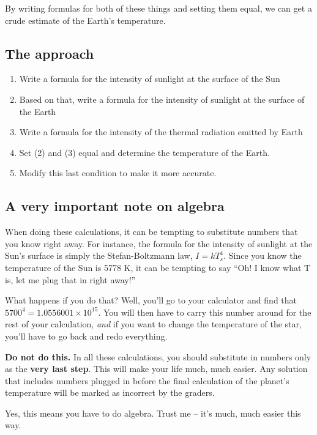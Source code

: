 \documentclass[11pt]{article}
\begin{document}
By writing formulas for both of these things and setting them equal, we can get a crude estimate of the Earth's temperature.

\subsection*{The approach}

\begin{enumerate}
\item{Write a formula for the intensity of sunlight at the surface of the Sun}
\item{Based on that, write a formula for the intensity of sunlight at the surface of the Earth}
\item{Write a formula for the intensity of the thermal radiation emitted by Earth}
\item{Set (2) and (3) equal and determine the temperature of the Earth.}
\item{Modify this last condition to make it more accurate.}
\end{enumerate}

\subsection*{A very important note on algebra}

When doing these calculations, it can be tempting to substitute numbers that you know right away. For instance, the formula for the intensity of sunlight at the Sun's surface is 
simply the Stefan-Boltzmann law, $I=kT_s^4$. Since you know the temperature of the Sun is 5778 K, it can be tempting to say ``Oh! I know what T is, let me plug that in right away!''

What happens if you do that? Well, you'll go to your calculator and find that $5700^4 = 1.0556001 \times 10^{15}$. You will then have to carry this number around for the rest of your 
calculation, {\it and} if you want to change the temperature of the star, you'll have to go back and redo everything. 

{\bf Do not do this.} In all these calculations, you should substitute in numbers only as the {\bf very last step}. This will make your life much, much easier. Any solution that includes
numbers plugged in before the final calculation of the planet's temperature will be marked as incorrect by the graders. 

Yes, this means you have to do algebra. Trust me -- it's much, much easier this way.
\end{document}
